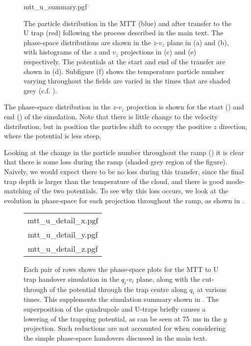\begin{figure}[p]
\centering
  {mtt_u_summary.pgf}
  \caption{
    The particle distribution in the MTT (blue) and after transfer to the U
    trap (red) following the process described in the main text. The
    phase-space distributions are shown in the $z$-$v_z$ plane in (a) and (b),
    with histograms of the $z$ and $v_z$ projections in (c) and (e)
    respectively. The potentials at the start and end of the transfer are shown
    in (d). Subfigure (f) shows the temperature particle number varying
    throughout the fields are varied in the times that are shaded grey (c.f.
    ). 
  }
  \label{design:fig:mttusim}
\end{figure}

The phase-space distribution in the $z$-$v_z$ projection is shown for the start
() and end
() of the simulation. Note that there is
little change to the velocity distribution, but in position the particles shift
to occupy the positive $z$ direction, where the potential is less steep.

Looking at the change in the particle number throughout the ramp
() it is clear that there is some loss
during the ramp (shaded grey region of the figure). Naively, we would expect
there to be no loss during this transfer, since the final trap depth is larger
than the temperature of the cloud, and there is good mode-matching of the two
potentials. To see why this loss occurs, we  look at the evolution in
phase-space for each projection throughout the ramp, as shown in
.

\begin{figure}[htp]
\centering
  \begin{tabular}{c}
  {mtt_u_detail_x.pgf} \\
  {mtt_u_detail_y.pgf} \\
  {mtt_u_detail_z.pgf}
  \end{tabular}
  \caption{
    Each pair of rows shows the phase-space plots for the MTT to U trap
    handover simulation in the $q_i$-$v_i$ plane, along with the cut-through of
    the potential through the trap centre along $q_i$ at various times. This
    supplements the simulation summary shown in .
    The superposition of the quadrupole and U-traps briefly causes a lowering
    of the trapping potential, as can be seen at \SI{75}{\milli\second} in the
    $y$ projection. Such reductions are not accounted for when considering the
    simple phase-space handovers discussed in the main text.
  }
  \label{design:fig:mttudetail}
\end{figure}

